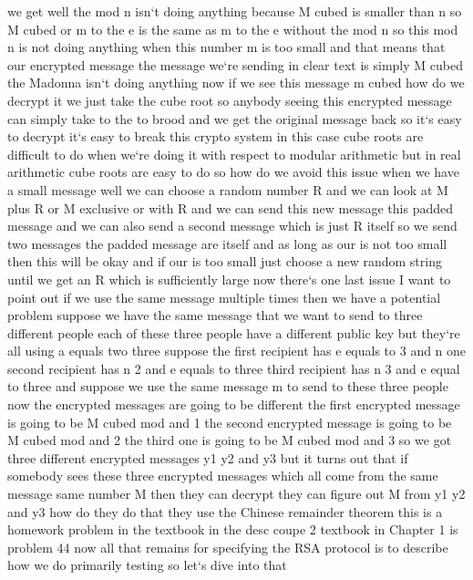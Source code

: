 we get well the mod n isn`t doing anything because M cubed is smaller than n so M cubed or m to the e is the same as m to the e without the mod n so this mod n is not doing anything when this number m is too small and that means that our encrypted message the message we`re sending in clear text is simply M cubed the Madonna isn`t doing anything now if we see this message m cubed how do we decrypt it we just take the cube root so anybody seeing this encrypted message can simply take to the to brood and we get the original message back so it`s easy to decrypt it`s easy to break this crypto system in this case cube roots are difficult to do when we`re doing it with respect to modular arithmetic but in real arithmetic cube roots are easy to do so how do we avoid this issue when we have a small message well we can choose a random number R and we can look at M plus R or M exclusive or with R and we can send this new message this padded message and we can also send a second message which is just R itself so we send two messages the padded message are itself and as long as our is not too small then this will be okay and if our is too small just choose a new random string until we get an R which is sufficiently large now there`s one last issue I want to point out if we use the same message multiple times then we have a potential problem suppose we have the same message that we want to send to three different people each of these three people have a different public key but they`re all using a equals two three suppose the first recipient has e equals to 3 and n one second recipient has n 2 and e equals to three third recipient has n 3 and e equal to three and suppose we use the same message m to send to these three people now the encrypted messages are going to be different the first encrypted message is going to be M cubed mod and 1 the second encrypted message is going to be M cubed mod and 2 the third one is going to be M cubed mod and 3 so we got three different encrypted messages y1 y2 and y3 but it turns out that if somebody sees these three encrypted messages which all come from the same message same number M then they can decrypt they can figure out M from y1 y2 and y3 how do they do that they use the Chinese remainder theorem this is a homework problem in the textbook in the desc coupe 2 textbook in Chapter 1 is problem 44 now all that remains for specifying the RSA protocol is to describe how we do primarily testing so let`s dive into that

